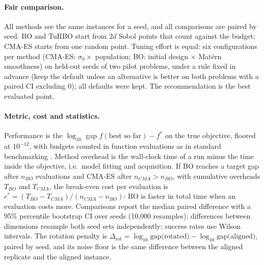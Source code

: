 \documentclass[10pt,a4paper,twocolumn]{article}
\newcommand{\Drot}{\Delta_{\mathrm{rot}}}
\begin{document}
\paragraph{Fair comparison.}
All methods see the same instances for a seed, and all comparisons are paired by seed. BO and TuRBO start from $2d$
Sobol points that count against the budget; CMA-ES starts from one random point. Tuning effort is equal: six
configurations per method (CMA-ES: $\sigma_0\times$ population; BO: initial design $\times$ Mat\'ern smoothness) on
held-out seeds of two pilot problems, under a rule fixed in advance (keep the default unless an alternative is better on
both problems with a paired CI excluding 0); all defaults were kept. The recommendation is the best evaluated point.

\paragraph{Metric, cost and statistics.}
Performance is the $\log_{10}$ gap $f(\text{best so far})-f^*$ on the true objective, floored at $10^{-12}$, with budgets
counted in function evaluations as in standard benchmarking \citep{hansen2021coco}. Method overhead is the wall-clock time
of a run minus the time inside the objective, i.e.\ model fitting and acquisition. If BO reaches a target gap after
$n_{BO}$ evaluations and CMA-ES after $n_{CMA}>n_{BO}$, with cumulative overheads $T_{BO}$ and $T_{CMA}$, the break-even
cost per evaluation is $c^*=(T_{BO}-T_{CMA})/(n_{CMA}-n_{BO})$: BO is faster in total time when an evaluation costs more.
Comparisons report the median paired difference with a 95\% percentile bootstrap CI over seeds (10{,}000 resamples);
differences between dimensions resample both seed sets independently; success rates use Wilson intervals. The rotation
penalty is $\Drot=\log_{10}\text{gap(rotated)}-\log_{10}\text{gap(aligned)}$, paired by seed, and its noise floor is the
same difference between the aligned replicate and the aligned instance.
\end{document}
